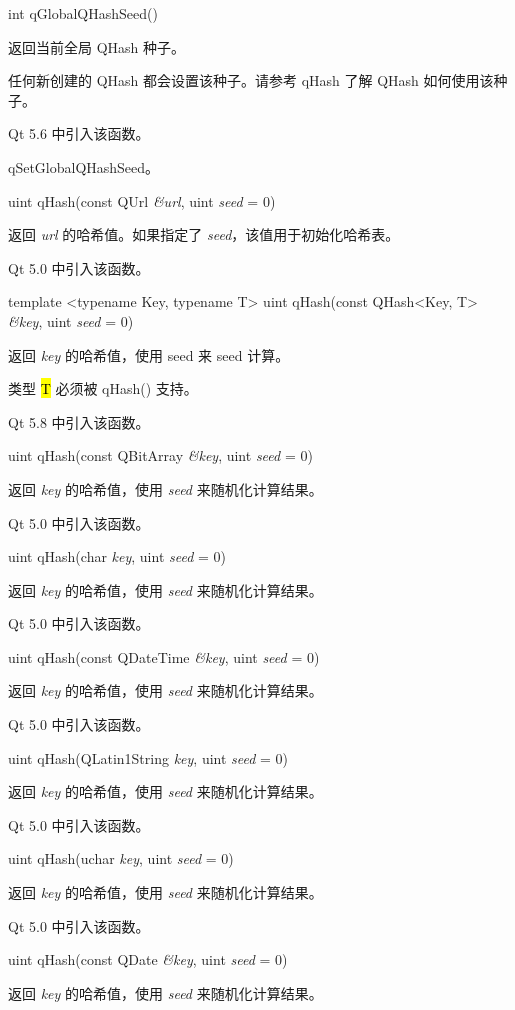 int qGlobalQHashSeed()

返回当前全局 QHash 种子。

任何新创建的 QHash 都会设置该种子。请参考 qHash 了解 QHash 如何使用该种子。

Qt 5.6 中引入该函数。

\begin{seeAlso}
qSetGlobalQHashSeed。
\end{seeAlso}

uint qHash(const QUrl \emph{\&url}, uint \emph{seed} = 0)

返回 \emph{url} 的哈希值。如果指定了 \emph{seed}，该值用于初始化哈希表。

Qt 5.0 中引入该函数。

template <typename Key, typename T> uint qHash(const QHash<Key, T> \emph{\&key}, uint \emph{seed} = 0)

返回 \emph{key} 的哈希值，使用 seed 来 seed 计算。

类型 \hl{T} 必须被 qHash() 支持。

Qt 5.8 中引入该函数。

uint qHash(const QBitArray \emph{\&key}, uint \emph{seed} = 0)

返回 \emph{key} 的哈希值，使用 \emph{seed} 来随机化计算结果。

Qt 5.0 中引入该函数。

uint qHash(char \emph{key}, uint \emph{seed} = 0)

返回 \emph{key} 的哈希值，使用 \emph{seed} 来随机化计算结果。

Qt 5.0 中引入该函数。

uint qHash(const QDateTime \emph{\&key}, uint \emph{seed} = 0)

返回 \emph{key} 的哈希值，使用 \emph{seed} 来随机化计算结果。

Qt 5.0 中引入该函数。

uint qHash(QLatin1String \emph{key}, uint \emph{seed} = 0)

返回 \emph{key} 的哈希值，使用 \emph{seed} 来随机化计算结果。

Qt 5.0 中引入该函数。

uint qHash(uchar \emph{key}, uint \emph{seed} = 0)

返回 \emph{key} 的哈希值，使用 \emph{seed} 来随机化计算结果。

Qt 5.0 中引入该函数。

uint qHash(const QDate \emph{\&key}, uint \emph{seed} = 0)

返回 \emph{key} 的哈希值，使用 \emph{seed} 来随机化计算结果。

